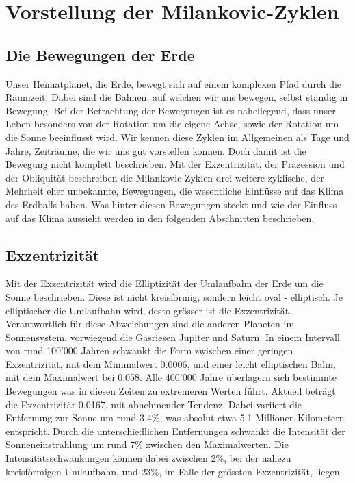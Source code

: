 %
%
%
%
\section{Vorstellung der Milankovic-Zyklen
\label{milankovic:section:teil1}}

\subsection{Die Bewegungen der Erde
\label{milankovic:subsection:Bewegungen der Erde}}
Unser Heimatplanet, die Erde, bewegt sich auf einem komplexen Pfad durch die Raumzeit.
Dabei sind die Bahnen, auf welchen wir uns bewegen, selbst ständig in Bewegung.
Bei der Betrachtung der Bewegungen ist es naheliegend, dass unser Leben besonders von der Rotation um die eigene Achse, sowie der Rotation um die Sonne beeinflusst wird.
Wir kennen diese Zyklen im Allgemeinen als Tage und Jahre, Zeiträume, die wir uns gut vorstellen können.
Doch damit ist die Bewegung nicht komplett beschrieben.
Mit der Exzentrizität, der Präzession und der Obliquität beschreiben die Milankovic-Zyklen drei weitere zyklische, der Mehrheit eher unbekannte, Bewegungen, die wesentliche Einflüsse auf das Klima des Erdballs haben.
Was hinter diesen Bewegungen steckt und wie der Einfluss auf das Klima aussieht werden in den folgenden Abschnitten beschrieben.

\subsection{Exzentrizität
\label{milankovic:subsection:Exzentrizität}}
Mit der Exzentrizität wird die Elliptizität der Umlaufbahn der Erde um die Sonne beschrieben.
Diese ist nicht kreisförmig, sondern leicht oval - elliptisch.
Je elliptischer die Umlaufbahn wird, desto grösser ist die Exzentrizität.
Verantwortlich für diese Abweichungen sind die anderen Planeten im Sonnensystem, vorwiegend die Gasriesen Jupiter und Saturn.
In einem Intervall von rund 100'000 Jahren schwankt die Form zwischen einer geringen Exzentrizität, mit dem Minimalwert 0.0006, und einer leicht elliptischen Bahn, mit dem Maximalwert bei 0.058.
Alle 400'000 Jahre überlagern sich bestimmte Bewegungen was in diesen Zeiten zu extremeren Werten führt.
Aktuell beträgt die Exzentrizität 0.0167, mit abnehmender Tendenz.
Dabei variiert die Entfernung zur Sonne um rund 3.4\%, was absolut etwa 5.1 Millionen Kilometern entspricht.
Durch die unterschiedlichen Entfernungen schwankt die Intensität der Sonneneinstrahlung um rund 7\% zwischen den Maximalwerten.
Die Intensitätsschwankungen können dabei zwischen 2\%, bei der nahezu kreisförmigen Umlaufbahn, und 23\%, im Falle der grössten Exzentrizität, liegen.


